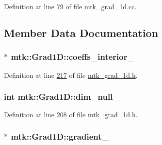 Definition at line \hyperlink{mtk__grad__1d_8cc_source_l00079}{79} of file \hyperlink{mtk__grad__1d_8cc_source}{mtk\+\_\+grad\+\_\+1d.\+cc}.



\subsection{Member Data Documentation}
\hypertarget{classmtk_1_1Grad1D_a2395861161c26f237e892aacebcc1909}{
\subsubsection[{coeffs\+\_\+interior\+\_\+}]{$\ast$ mtk\+::\+Grad1\+D\+::coeffs\+\_\+interior\+\_\+\hspace{0.3cm}{\ttfamily [private]}}}\label{classmtk_1_1Grad1D_a2395861161c26f237e892aacebcc1909}


Definition at line \hyperlink{mtk__grad__1d_8h_source_l00217}{217} of file \hyperlink{mtk__grad__1d_8h_source}{mtk\+\_\+grad\+\_\+1d.\+h}.

\hypertarget{classmtk_1_1Grad1D_abe8eaf4f5c451f82c062daaef31e9e6a}{
\subsubsection[{dim\+\_\+null\+\_\+}]{\setlength{\rightskip}{0pt plus 5cm}int mtk\+::\+Grad1\+D\+::dim\+\_\+null\+\_\+\hspace{0.3cm}{\ttfamily [private]}}}\label{classmtk_1_1Grad1D_abe8eaf4f5c451f82c062daaef31e9e6a}


Definition at line \hyperlink{mtk__grad__1d_8h_source_l00208}{208} of file \hyperlink{mtk__grad__1d_8h_source}{mtk\+\_\+grad\+\_\+1d.\+h}.

\hypertarget{classmtk_1_1Grad1D_a024b84b1ea285c0c590eb42d40ff4469}{
\subsubsection[{gradient\+\_\+}]{$\ast$ mtk\+::\+Grad1\+D\+::gradient\+\_\+\hspace{0.3cm}{\ttfamily [private]}}}\label{classmtk_1_1Grad1D_a024b84b1ea285c0c590eb42d40ff4469}


